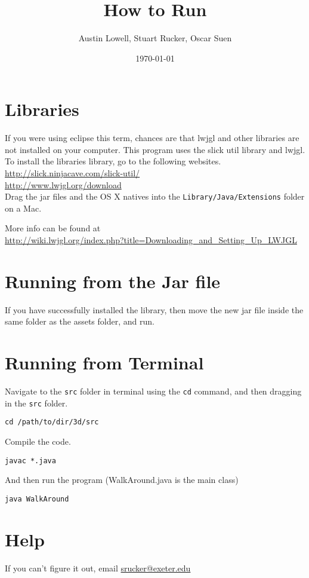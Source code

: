 \documentclass[12pt]{article}
\title{How to Run}
\author{Austin Lowell, Stuart Rucker, Oscar Suen}
\date{\today}
\begin{document}
\maketitle
\section{Libraries}
If you were using eclipse this term, chances are that lwjgl and other libraries are not installed on your computer. This program uses the slick util library and lwjgl. To install the libraries library, go to the following websites.\\
\url{http://slick.ninjacave.com/slick-util/}\\
\url{http://www.lwjgl.org/download}\\

Drag the jar files and the OS X natives into the \texttt{Library/Java/Extensions} folder on a Mac.

More info can be found at\\
\url{http://wiki.lwjgl.org/index.php?title=Downloading_and_Setting_Up_LWJGL}

\section{Running from the Jar file}
If you have successfully installed the library, then move the new jar file inside the same folder as the assets folder, and run.

\section{Running from Terminal}
Navigate to the \texttt{src} folder in terminal using the \texttt{cd} command, and then dragging in the \texttt{src} folder.
\begin{verbatim}
cd /path/to/dir/3d/src 
\end{verbatim} 
Compile the code.
\begin{verbatim}
javac *.java
\end{verbatim} 
And then run the program (WalkAround.java is the main class)
\begin{verbatim}
java WalkAround
\end{verbatim} 
\section{Help}
If you can't figure it out, email \url{srucker@exeter.edu}
\end{document}
